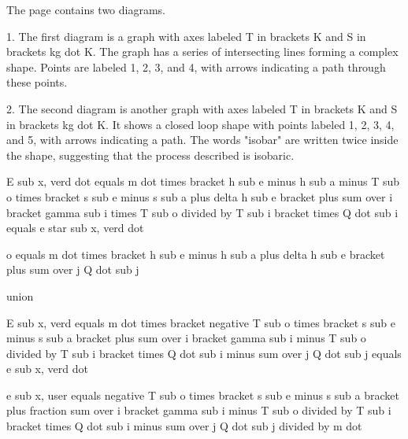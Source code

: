 The page contains two diagrams.

1. The first diagram is a graph with axes labeled T in brackets K and S in brackets kg dot K. The graph has a series of intersecting lines forming a complex shape. Points are labeled 1, 2, 3, and 4, with arrows indicating a path through these points.

2. The second diagram is another graph with axes labeled T in brackets K and S in brackets kg dot K. It shows a closed loop shape with points labeled 1, 2, 3, 4, and 5, with arrows indicating a path. The words "isobar" are written twice inside the shape, suggesting that the process described is isobaric.

E sub x, verd dot equals m dot times bracket h sub e minus h sub a minus T sub o times bracket s sub e minus s sub a plus delta h sub e bracket plus sum over i bracket gamma sub i times T sub o divided by T sub i bracket times Q dot sub i equals e star sub x, verd dot

o equals m dot times bracket h sub e minus h sub a plus delta h sub e bracket plus sum over j Q dot sub j

union

E sub x, verd equals m dot times bracket negative T sub o times bracket s sub e minus s sub a bracket plus sum over i bracket gamma sub i minus T sub o divided by T sub i bracket times Q dot sub i minus sum over j Q dot sub j equals e sub x, verd dot

e sub x, user equals negative T sub o times bracket s sub e minus s sub a bracket plus fraction sum over i bracket gamma sub i minus T sub o divided by T sub i bracket times Q dot sub i minus sum over j Q dot sub j divided by m dot